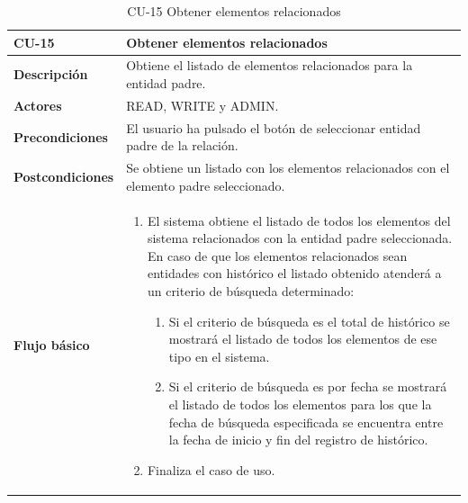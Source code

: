 \begin{table} [H]
    \centering
    \setlength{\leftmargini}{0.4cm}
	\resizebox{14cm}{!} { %
    \begin{tabular}{| m{3cm} | m{11cm} |}   
    \hline
	  \textbf{CU-15} & \textbf{Obtener elementos relacionados} \\\hline
	  \textbf{Descripción} & Obtiene el listado de elementos relacionados para la entidad padre. \\\hline
	  \textbf{Actores} & READ, WRITE y ADMIN. \\\hline
	  \textbf{Precondiciones} & El usuario ha pulsado el botón de seleccionar entidad padre de la relación. \\\hline
	  \textbf{Postcondiciones} & Se obtiene un listado con los elementos relacionados con el elemento padre seleccionado. \\\hline
	  \textbf{Flujo básico} & 
		\begin{enumerate}
	  	\item El sistema obtiene el listado de todos los elementos del sistema relacionados con la entidad padre seleccionada. En caso de que los elementos relacionados sean entidades con histórico el listado obtenido atenderá a un criterio de búsqueda determinado:
	  	    \begin{enumerate}	
			   \item Si el criterio de búsqueda es el total de histórico se mostrará el listado de todos los elementos de ese tipo en el sistema.
			   \item Si el criterio de búsqueda es por fecha se mostrará el listado de todos los elementos para los que la fecha de búsqueda especificada se encuentra entre la fecha de inicio y fin del registro de histórico.
			\end{enumerate}
		\item Finaliza el caso de uso.				
	  \end{enumerate} 	  	  
	  \\\hline
    \end{tabular}
    } %
    \caption{CU-15 Obtener elementos relacionados}
    \label{tab:cu-obtener-elementos-relacionados}
\end{table}


